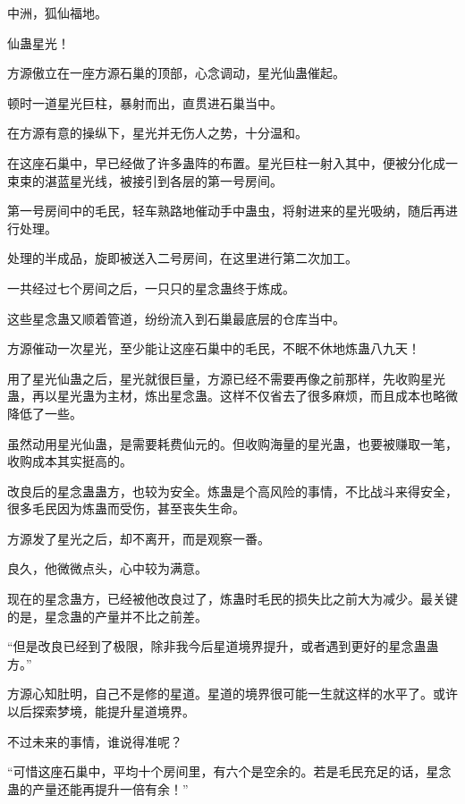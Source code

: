 
\begin{this_body}



中洲，狐仙福地。

仙蛊星光！

方源傲立在一座方源石巢的顶部，心念调动，星光仙蛊催起。

顿时一道星光巨柱，暴射而出，直贯进石巢当中。

在方源有意的操纵下，星光并无伤人之势，十分温和。

在这座石巢中，早已经做了许多蛊阵的布置。星光巨柱一射入其中，便被分化成一束束的湛蓝星光线，被接引到各层的第一号房间。

第一号房间中的毛民，轻车熟路地催动手中蛊虫，将射进来的星光吸纳，随后再进行处理。

处理的半成品，旋即被送入二号房间，在这里进行第二次加工。

一共经过七个房间之后，一只只的星念蛊终于炼成。

这些星念蛊又顺着管道，纷纷流入到石巢最底层的仓库当中。

方源催动一次星光，至少能让这座石巢中的毛民，不眠不休地炼蛊八九天！

用了星光仙蛊之后，星光就很巨量，方源已经不需要再像之前那样，先收购星光蛊，再以星光蛊为主材，炼出星念蛊。这样不仅省去了很多麻烦，而且成本也略微降低了一些。

虽然动用星光仙蛊，是需要耗费仙元的。但收购海量的星光蛊，也要被赚取一笔，收购成本其实挺高的。

改良后的星念蛊蛊方，也较为安全。炼蛊是个高风险的事情，不比战斗来得安全，很多毛民因为炼蛊而受伤，甚至丧失生命。

方源发了星光之后，却不离开，而是观察一番。

良久，他微微点头，心中较为满意。

现在的星念蛊方，已经被他改良过了，炼蛊时毛民的损失比之前大为减少。最关键的是，星念蛊的产量并不比之前差。

“但是改良已经到了极限，除非我今后星道境界提升，或者遇到更好的星念蛊蛊方。”

方源心知肚明，自己不是修的星道。星道的境界很可能一生就这样的水平了。或许以后探索梦境，能提升星道境界。

不过未来的事情，谁说得准呢？

“可惜这座石巢中，平均十个房间里，有六个是空余的。若是毛民充足的话，星念蛊的产量还能再提升一倍有余！”


\end{this_body}
